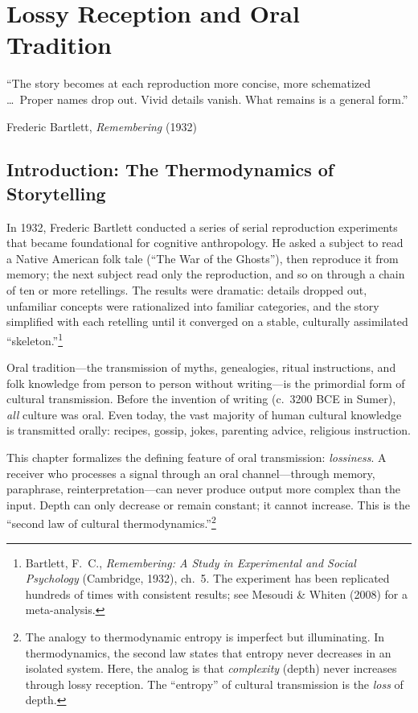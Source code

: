 \chapter{Lossy Reception and Oral Tradition}
\label{ch:lossy}

\epigraph{%
  ``The story becomes at each reproduction more concise, more schematized
  \ldots\ Proper names drop out. Vivid details vanish.
  What remains is a general form.''}%
  {Frederic Bartlett, \textit{Remembering} (1932)}

\section{Introduction: The Thermodynamics of Storytelling}
\label{sec:lossy-intro}

In 1932, Frederic Bartlett conducted a series of serial reproduction
experiments that became foundational for cognitive anthropology.  He asked a
subject to read a Native American folk tale (``The War of the Ghosts''), then
reproduce it from memory; the next subject read only the reproduction, and
so on through a chain of ten or more retellings.  The results were dramatic:
details dropped out, unfamiliar concepts were rationalized into familiar
categories, and the story simplified with each retelling until it converged
on a stable, culturally assimilated ``skeleton.''\footnote{Bartlett, F.~C.,
\textit{Remembering: A Study in Experimental and Social Psychology}
(Cambridge, 1932), ch.~5.  The experiment has been replicated hundreds of
times with consistent results; see Mesoudi \& Whiten (2008) for a
meta-analysis.}

Oral tradition---the transmission of myths, genealogies, ritual
instructions, and folk knowledge from person to person without writing---is
the primordial form of cultural transmission.  Before the invention of
writing (c.~3200 BCE in Sumer), \emph{all} culture was oral.  Even today,
the vast majority of human cultural knowledge is transmitted orally: recipes,
gossip, jokes, parenting advice, religious instruction.

This chapter formalizes the defining feature of oral transmission:
\emph{lossiness}.  A receiver who processes a signal through an oral
channel---through memory, paraphrase, reinterpretation---can never produce
output more complex than the input.  Depth can only decrease or remain
constant; it cannot increase.  This is the ``second law of cultural
thermodynamics.''\footnote{The analogy to thermodynamic entropy is
imperfect but illuminating.  In thermodynamics, the second law states that
entropy never decreases in an isolated system.  Here, the analog is that
\emph{complexity} (depth) never increases through lossy reception.  The
``entropy'' of cultural transmission is the \emph{loss} of depth.}

